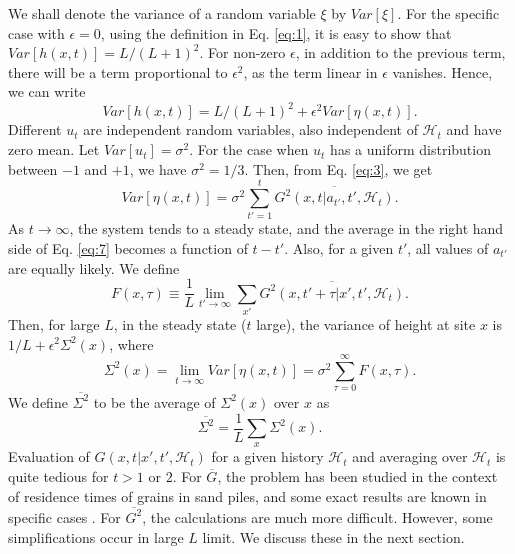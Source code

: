 \documentclass[11pt,a4paper]{book}
\begin{document}
We shall denote the variance of a random variable $\xi$ by  $Var[\xi ]$.
For the specific case with $\epsilon=0$, using the definition
in Eq. \eqref{eq:1}, it is easy to show that
$Var[h(x,t)]=L/(L+1)^2$. For non-zero $\epsilon$, in addition to the previous
term, there will be a term proportional to $\epsilon^2$, as the term linear in $\epsilon$ vanishes. 
Hence, we can write
\begin{equation}
Var[h(x,t)] =   L / (L+1)^2 + \epsilon^2 Var[\eta(x,t)].
\end{equation}
Different $u_t$ are independent random variables, also independent of 
$\mathcal{H}_t$ and have zero mean. Let $Var[ u_t] = \sigma^2$. For the case 
when $u_t$ has a uniform distribution between $ -1$ and $ +1$, we have 
$\sigma^2  =  1/3$. Then, from Eq. \eqref{eq:3}, 
we get
\begin{equation}
  \label{eq:7}
  Var[\eta(x,t)] =  \sigma^2
\sum_{t'=1}^{t} \overline{G^2(x,t|a_{t'},t',\mathcal{H}_t)}.
\end{equation}
As $t \rightarrow \infty$, the system tends to a steady state, and the 
average in the 
right hand side of Eq. \eqref{eq:7} becomes a function of $t-t'$. Also, for a 
given $t'$, all values of $a_{t'}$ are equally likely. We define
\begin{equation}
  \label{eq:8}
F(x,\tau) \equiv \frac{1}{L} \lim_{t' \rightarrow \infty}\sum_{x'} 
\overline{G^2(x,t'+ \tau | 
x',t',\mathcal{H}_t)}.
\end{equation}
Then, for large $L$, in the steady state ($t$ large), the variance of height at site 
$x$ is $1/L+\epsilon^2\Sigma^2(x)$, where 
\begin{equation}
  \label{eq:9}
  \Sigma^2(x) = \lim_{t \rightarrow \infty} Var[\eta(x,t)] = \sigma^2 \sum_{\tau=0}^{\infty} F(x,\tau).
\end{equation}
We define $\overline{\Sigma^2}$ to be the  average of $\Sigma^2(x)$ over 
$x$ as
\begin{equation}
\overline{\Sigma^2} = \frac{1}{L} \sum_x \Sigma^2(x).
\end{equation}
Evaluation of $G(x,t|x',t',\mathcal{H}_t)$ for a given history 
$\mathcal{H}_t$ and averaging over $\mathcal{H}_t$ is quite tedious for 
$t > 1$ or $2$.  For $\overline{G}$, the problem has been studied in 
the context of residence times of grains in sand piles, and some exact results 
are known in specific cases \cite{punya}.  For $\overline{G^2}$, 
the calculations are much more difficult.  However, some simplifications 
occur in large $L$ limit. We discuss these in the next section.
\end{document}
